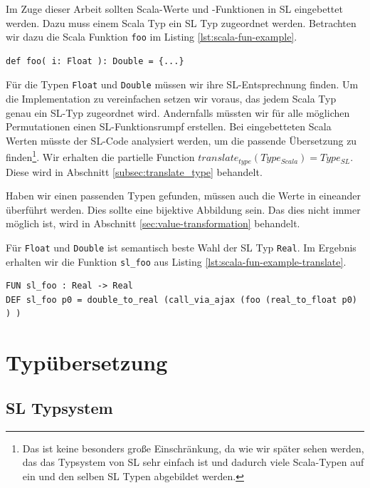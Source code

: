 \documentclass[12pt]{scrreprt}
\begin{document}
Im Zuge dieser Arbeit sollten Scala-Werte und -Funktionen in \ac{SL} eingebettet werden. Dazu muss einem Scala Typ ein \ac{SL} Typ zugeordnet werden. Betrachten wir dazu die Scala Funktion \lstinline!foo! im Listing \ref{lst:scala-fun-example}.

\begin{lstlisting}[caption=Beispielfunktion foo, label=lst:scala-fun-example]
def foo( i: Float ): Double = {...}
\end{lstlisting}

Für die Typen \lstinline!Float! und \lstinline!Double! müssen wir ihre \ac{SL}-Entsprechnung finden. Um die Implementation zu vereinfachen setzen wir voraus, das jedem Scala Typ genau ein \ac{SL}-Typ zugeordnet wird. Andernfalls müssten wir für alle möglichen Permutationen einen \ac{SL}-Funktionsrumpf erstellen. Bei eingebetteten Scala Werten müsste der SL-Code analysiert werden, um die passende Übersetzung zu finden\footnote{Das ist keine besonders große Einschränkung, da wie wir später sehen werden, das das Typsystem von SL sehr einfach ist und dadurch viele Scala-Typen auf ein und den selben SL Typen abgebildet werden. }. Wir erhalten die partielle Function $translate_{type}(Type_{Scala}) = Type_{SL}$. Diese wird in Abschnitt \ref{subsec:translate_type} behandelt.

Haben wir einen passenden Typen gefunden, müssen auch die Werte in eineander überführt werden. Dies sollte eine bijektive Abbildung sein. Das dies nicht immer möglich ist, wird in Abschnitt \ref{sec:value-transformation} behandelt.

Für \lstinline!Float! und \lstinline!Double! ist semantisch beste Wahl der SL Typ \lstinline!Real!. Im Ergebnis erhalten wir die Funktion \lstinline!sl_foo! aus Listing \ref{lst:scala-fun-example-translate}.

\begin{lstlisting}[caption=Übersetzung von foo, label=lst:scala-fun-example-translate]
FUN sl_foo : Real -> Real
DEF sl_foo p0 = double_to_real (call_via_ajax (foo (real_to_float p0) ) )
\end{lstlisting}

\section{Typübersetzung}
\label{sec:type-translation}


\subsection{SL Typsystem}
\end{document}
